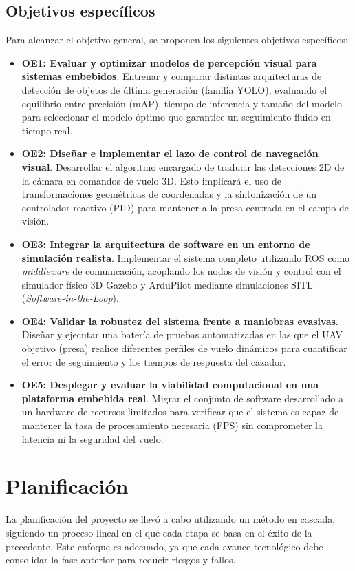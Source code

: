 \subsection{Objetivos específicos}
Para alcanzar el objetivo general, se proponen los siguientes objetivos específicos:
\begin{itemize}
    \item \textbf{OE1: Evaluar y optimizar modelos de percepción visual para sistemas embebidos}. Entrenar y comparar distintas arquitecturas de detección de objetos de última generación (familia YOLO), evaluando el equilibrio entre precisión (mAP), tiempo de inferencia y tamaño del modelo para seleccionar el modelo óptimo que garantice un seguimiento fluido en tiempo real.
    \item \textbf{OE2: Diseñar e implementar el lazo de control de navegación visual}. Desarrollar el algoritmo encargado de traducir las detecciones 2D de la cámara en comandos de vuelo 3D. Esto implicará el uso de transformaciones geométricas de coordenadas y la sintonización de un controlador reactivo (PID) para mantener a la presa centrada en el campo de visión.
    \item \textbf{OE3: Integrar la arquitectura de software en un entorno de simulación realista}. Implementar el sistema completo utilizando ROS como \textit{middleware} de comunicación, acoplando los nodos de visión y control con el simulador físico 3D Gazebo y ArduPilot mediante simulaciones SITL (\textit{Software-in-the-Loop}).
    \item \textbf{OE4: Validar la robustez del sistema frente a maniobras evasivas}. Diseñar y ejecutar una batería de pruebas automatizadas en las que el UAV objetivo (presa) realice diferentes perfiles de vuelo dinámicos para cuantificar el error de seguimiento y los tiempos de respuesta del cazador.
    \item \textbf{OE5: Desplegar y evaluar la viabilidad computacional en una plataforma embebida real}. Migrar el conjunto de software desarrollado a un hardware de recursos limitados para verificar que el sistema es capaz de mantener la tasa de procesamiento necesaria (FPS) sin comprometer la latencia ni la seguridad del vuelo.
\end{itemize}


\section{Planificación}
La planificación del proyecto se llevó a cabo utilizando un método en cascada, siguiendo un proceso lineal en el que cada etapa se basa en el éxito de la precedente. Este enfoque es adecuado, ya que cada avance tecnológico debe consolidar la fase anterior para reducir riesgos y fallos.

